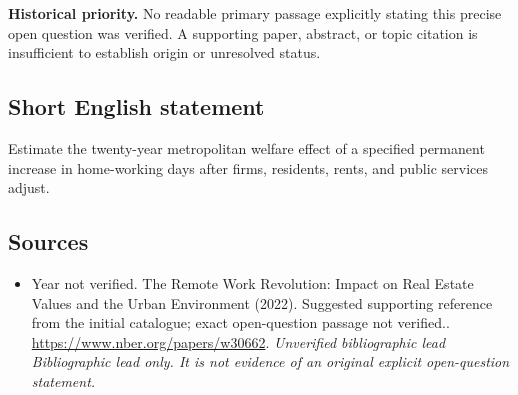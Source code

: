 \documentclass[11pt]{article}
\begin{document}
\par\textbf{Historical priority.} No readable primary passage explicitly stating this precise open question was verified. A supporting paper, abstract, or topic citation is insufficient to establish origin or unresolved status.

\subsection{Short English statement}
Estimate the twenty-year metropolitan welfare effect of a specified permanent increase in home-working days after firms, residents, rents, and public services adjust.

\subsection{Sources}
\begin{itemize}\raggedright
\item[\textnormal{[S1]}]\hypertarget{source:30007750:1}{} Year not verified. The Remote Work Revolution: Impact on Real Estate Values and the Urban Environment (2022). Suggested supporting reference from the initial catalogue; exact open-question passage not verified..
\url{https://www.nber.org/papers/w30662}.
{\small\textit{Unverified bibliographic lead Bibliographic lead only. It is not evidence of an original explicit open-question statement.}}
\end{itemize}
\end{document}
